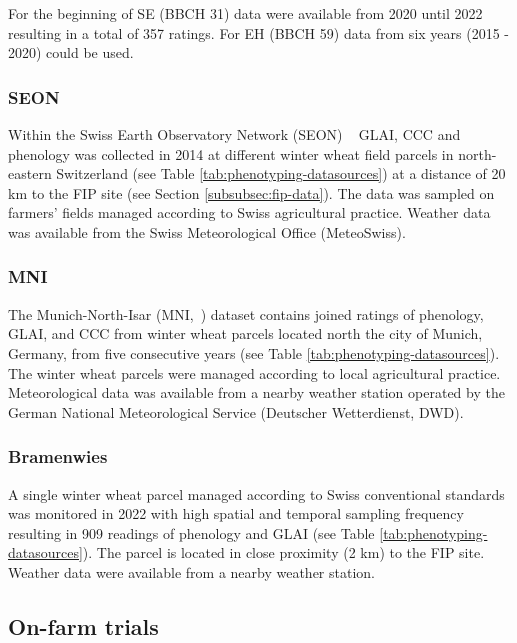 For the beginning of SE (BBCH 31) data were available from 2020 until 2022 resulting in a total of 357 ratings. For EH (BBCH 59) data from six years (2015 - 2020) could be used.

\subsubsection{SEON}
\label{subsubsec:seon-data}
Within the Swiss Earth Observatory Network (SEON) ~\citep{liebisch_characterization_2014} GLAI, \gls{CCC} and phenology was collected in 2014 at different winter wheat field parcels in north-eastern Switzerland (see Table \ref{tab:phenotyping-datasources}) at a distance of 20 km to the FIP site (see Section \ref{subsubsec:fip-data}). The data was sampled on farmers' fields managed according to Swiss agricultural practice. Weather data was available from the Swiss Meteorological Office (MeteoSwiss).

\subsubsection{MNI}
\label{subsubsec:mni-data}
The Munich-North-Isar (MNI,~\citep{danner_fitted_2019,wocher_physically-based_2018}) dataset contains joined ratings of phenology, GLAI, and \gls{CCC} from winter wheat parcels located north the city of Munich, Germany, from five consecutive years (see Table \ref{tab:phenotyping-datasources}). The winter wheat parcels were managed according to local agricultural practice. Meteorological data was available from a nearby weather station operated by the German National Meteorological Service (Deutscher Wetterdienst, DWD).

\subsubsection{Bramenwies}
\label{subsubsec:bramenwies-data}
A single winter wheat parcel managed according to Swiss conventional standards was monitored in 2022 with high spatial and temporal sampling frequency resulting in 909 readings of phenology and \gls{GLAI} (see Table \ref{tab:phenotyping-datasources}). The parcel is located in close proximity (2 km) to the FIP site. Weather data were available from a nearby weather station.

\subsection{On-farm trials}
\label{subsec:on-farm-trials}

